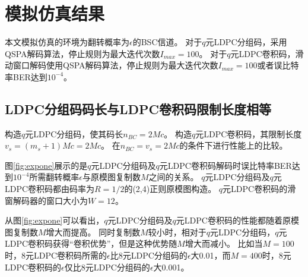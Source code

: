 \chapter{模拟仿真结果}
本文模拟仿真的环境为翻转概率为$\epsilon$的BSC信道。
对于$q$元LDPC分组码，采用QSPA解码算法，停止规则为最大迭代次数$I_{max}=100$。
对于$q$元LDPC卷积码，滑动窗口解码使用QSPA解码算法，停止规则为最大迭代次数$I_{max}=100$或者误比特率BER达到$10^{-4}$。
\section{LDPC分组码码长与LDPC卷积码限制长度相等}
构造$q$元LDPC分组码，使其码长$n_{BC}=2Mc$。
构造$q$元LDPC卷积码，其限制长度$v_s=(m_s+1)Mc=2Mc$。
在$n_{BC}=v_s=2Mc$的条件下进行性能上的比较。
\begin{center}
\pgfplotsset{compat=1.13}
\label{fig:expone}
\end{center}

图\ref{fig:expone}展示的是$q$元LDPC分组码及$q$元LDPC卷积码解码时误比特率BER达到$10^{-4}$所需翻转概率$\epsilon$与原模图复制数$M$之间的关系。
$q$元LDPC分组码及$q$元LDPC卷积码都由码率为$R=1/2$的(2,4)正则原模图构造。
$q$元LDPC卷积码的滑窗解码器的窗口大小为$W=12$。

从图\ref{fig:expone}可以看出，$q$元LDPC分组码及$q$元LDPC卷积码的性能都随着原模图复制数$M$增大而提高。
同时复制数$M$较小时，相对于$q$元LDPC分组码，$q$元LDPC卷积码获得“卷积优势”，但是这种优势随$M$增大而减小。
比如当$M=100$时，8元LDPC卷积码所需的$\epsilon$比8元LDPC分组码的$\epsilon$大0.01，而$M=400$时，8元LDPC卷积码的$\epsilon$仅比8元LDPC分组码的$\epsilon$大0.001。

